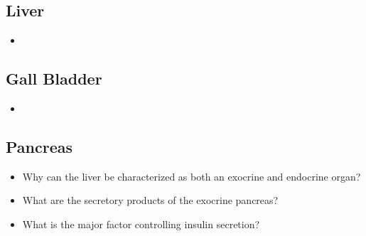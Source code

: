 \begin{itemize}
  \subsection{Liver}\label{Liver}
  \begin{multicols}{2}
  \begin{itemize}
    \item 
  \end{itemize}
  \end{multicols}
  
  \subsection{Gall Bladder}\label{Gall Bladder}
  \begin{multicols}{2}
  \begin{itemize}
    \item 
  \end{itemize}
  \end{multicols}
  
  \subsection{Pancreas}\label{Pancreas}
  \begin{multicols}{2}
  \begin{itemize}
    \item Why can the liver be characterized as both an exocrine and endocrine organ?
    \item What are the secretory products of the exocrine pancreas?
    \item What is the major factor controlling insulin secretion?
  \end{itemize}
  \end{multicols}

\end{itemize}
